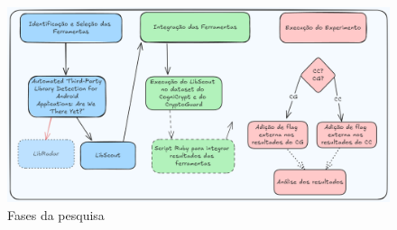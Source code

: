 \begin{figure}[!ht]
  \centering
  \includegraphics[scale=0.4]{img/research_steps2.png}
  \caption{Fases da pesquisa}
  \label{img: research_steps2}
\end{figure}
